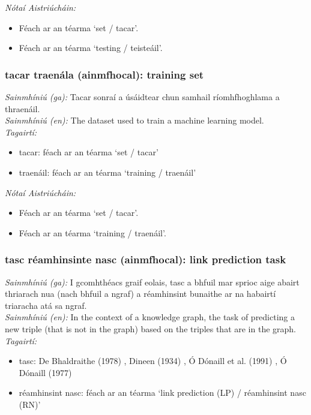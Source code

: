  \noindent \textit{Nótaí Aistriúcháin:}
\begin{itemize}
	\item Féach ar an téarma `set / tacar'.
	\item Féach ar an téarma `testing / teisteáil'.
\end{itemize}


\subsubsection*{tacar traenála (ainmfhocal): training set}
 \noindent \textit{Sainmhíniú (ga):} Tacar sonraí a úsáidtear chun samhail ríomhfhoghlama a thraenáil.
\\
 \noindent \textit{Sainmhíniú (en):} The dataset used to train a machine learning model.
\\
 \noindent \textit{Tagairtí:}
\begin{itemize}
	\item tacar: féach ar an téarma `set / tacar'
	\item traenáil: féach ar an téarma `training / traenáil'
\end{itemize}

 \noindent \textit{Nótaí Aistriúcháin:}
\begin{itemize}
	\item Féach ar an téarma `set / tacar'.
	\item Féach ar an téarma `training / traenáil'.
\end{itemize}


\subsubsection*{tasc réamhinsinte nasc (ainmfhocal): link prediction task}
 \noindent \textit{Sainmhíniú (ga):} I gcomhthéacs graif eolais, tasc a bhfuil mar sprioc aige abairt thriarach nua (nach bhfuil a ngraf) a réamhinsint bunaithe ar na habairtí triaracha atá sa ngraf.
\\
 \noindent \textit{Sainmhíniú (en):} In the context of a knowledge graph, the task of predicting a new triple (that is not in the graph) based on the triples that are in the graph.
\\
 \noindent \textit{Tagairtí:}
\begin{itemize}
	\item tasc: De Bhaldraithe (1978) \cite{de-bhaldraithe}, Dineen (1934) \cite{dineen}, Ó Dónaill et al. (1991) \cite{focloir-beag}, Ó Dónaill (1977) \cite{odonaill}
	\item réamhinsint nasc: féach ar an téarma `link prediction (LP) / réamhinsint nasc (RN)'
\end{itemize}

